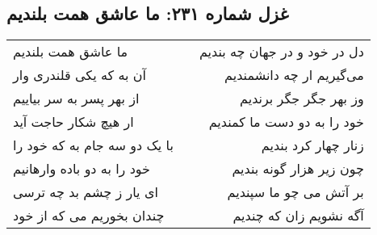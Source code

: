 \begin{center}
\section*{غزل شماره ۲۳۱: ما عاشق همت بلندیم}
\label{sec:231}
\begin{longtable}{l p{0.5cm} r}
ما عاشق همت بلندیم
&&
دل در خود و در جهان چه بندیم
\\
آن به که یکی قلندری وار
&&
می‌گیریم ار چه دانشمندیم
\\
از بهر پسر به سر بیاییم
&&
وز بهر جگر جگر برندیم
\\
ار هیچ شکار حاجت آید
&&
خود را به دو دست ما کمندیم
\\
با یک دو سه جام به که خود را
&&
زنار چهار کرد بندیم
\\
خود را به دو باده وارهانیم
&&
چون زیر هزار گونه بندیم
\\
ای یار ز چشم بد چه ترسی
&&
بر آتش می چو ما سپندیم
\\
چندان بخوریم می که از خود
&&
آگه نشویم زان که چندیم
\\
\end{longtable}
\end{center}
